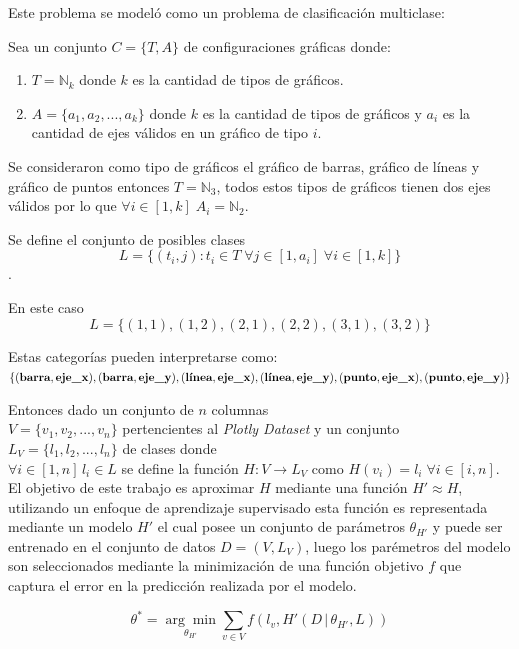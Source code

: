 \documentclass[a4paper,10pt,twocolumn]{article}
\begin{document}
	Este problema se model\'o como un problema de clasificaci\'on multiclase:
	
	Sea un conjunto $C = \{T, A\}$ de configuraciones gr\'aficas donde:
	\begin{enumerate}
		\item $T = \mathbb{N}_k$ donde $k$ es la cantidad de tipos de gr\'aficos.
		\item $A = \{a_1, a_2,...,a_k\}$ donde $k$ es la cantidad de tipos de gr\'aficos y $a_i$ es la
		cantidad de ejes v\'alidos en un gr\'afico de tipo $i$.
	\end{enumerate}
		
	Se consideraron como tipo de gr\'aficos el gr\'afico de barras, gr\'afico de l\'ineas y gr\'afico de puntos entonces $T = \mathbb{N}_3$, 
	todos estos tipos de gr\'aficos tienen dos ejes v\'alidos por lo que $\forall i \in [1,k] \; A_i = \mathbb{N}_2$.

	Se define el conjunto de posibles clases
	$$L = \{ (t_i, j): t_i \in T \;\forall j \in [1, a_i] \;\forall i \in [1,k] \}$$.

	En este caso $$L = \{ (1,1),(1,2),(2,1),(2,2),(3,1),(3,2) \}$$
	
	Estas categor\'ias pueden interpretarse como:\\
	$\{(\textbf{barra}, \textbf{eje\_x}), (\textbf{barra}, \textbf{eje\_y}),
	(\textbf{l\'inea}, \textbf{eje\_x})\\, (\textbf{l\'inea}, \textbf{eje\_y}),
	(\textbf{punto}, \textbf{eje\_x}), (\textbf{punto}, \textbf{eje\_y}) \}$

	Entonces dado un conjunto de $n$ columnas\\ $V = \{v_1, v_2, ..., v_n \}$ pertencientes al \textit{Plotly Dataset} y 
	un conjunto $L_V = \{l_1, l_2,...,l_n\}$ de clases donde \\$\forall i \in [1,n]\, l_i \in L$ se define la funci\'on
	$H:V \to L_V$ como $H(v_i) = l_i \;\forall i \in [i,n]$. El objetivo de este trabajo es aproximar $H$ mediante
	una funci\'on $H' \approx H$, utilizando un enfoque de aprendizaje supervisado
	esta funci\'on es representada mediante un modelo $H'$ el cual posee un conjunto de
	par\'ametros $\theta_{H'}$ y puede ser entrenado en el conjunto de datos $D = (V,L_V)$, luego
	los par\'emetros del modelo son seleccionados mediante la minimizaci\'on de una funci\'on
	objetivo $f$ que captura el error en la predicci\'on realizada por el modelo.

	$$
		\theta^* = \underset{\theta_{H'}}{\arg \min} \underset{v \in V}{\sum} f(l_v, H'(D \,|\, \theta_{H'}, L))
	$$
\end{document}
